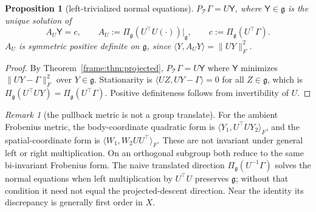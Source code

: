 \documentclass[11pt]{article}
\newtheorem{proposition}[theorem]{Proposition}
\theoremstyle{definition}
\theoremstyle{remark}
\newtheorem{remark}[theorem]{Remark}
\providecommand{\g}{\mathfrak{g}}
\providecommand{\ip}[2]{\langle #1, #2\rangle}
\begin{document}
\begin{proposition}[left-trivialized normal equations]\label{frame:prop:normal}
$P_\mathcal{T}\Gamma=U\mathsf{Y}$, where $\mathsf{Y}\in\g$ is the unique solution of
\begin{equation}\label{frame:eq:normal}
A_U\mathsf{Y}=c,\qquad A_U:=\Pi_\g(U^\top U(\cdot))|_\g,\qquad c:=\Pi_\g(U^\top\Gamma).
\end{equation}
$A_U$ is symmetric positive definite on $\g$, since $\ip{Y}{A_UY}=\|UY\|_F^2$.
\end{proposition}
\begin{proof}
By Theorem~\ref{frame:thm:projected}, $P_\mathcal{T}\Gamma=U\mathsf{Y}$ where $\mathsf{Y}$ minimizes $\|UY-\Gamma\|_F^2$ over $Y\in\g$. Stationarity is $\ip{UZ}{UY-\Gamma}=0$ for all $Z\in\g$, which is $\Pi_\g(U^\top UY)=\Pi_\g(U^\top\Gamma)$. Positive definiteness follows from invertibility of $U$.
\end{proof}

\begin{remark}[the pullback metric is not a group translate]\label{frame:rem:translate}
For the ambient Frobenius metric, the body-coordinate quadratic form is \(\langle Y_1,U^\top UY_2\rangle_F\), and the spatial-coordinate form is \(\langle W_1,W_2UU^\top\rangle_F\). These are not invariant under general left or right multiplication. On an orthogonal subgroup both reduce to the same bi-invariant Frobenius form. The naive translated direction \(\Pi_\g(U^{-1}\Gamma)\) solves the normal equations when left multiplication by \(U^\top U\) preserves \(\g\); without that condition it need not equal the projected-descent direction. Near the identity its discrepancy is generally first order in \(X\).
\end{remark}
\end{document}
